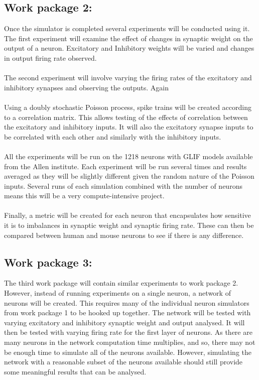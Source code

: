 \documentclass{epsrc}
\begin{document}
\subsection{Work package 2:}
\noindent
Once the simulator is completed several experiments will be conducted using it. The first experiment will examine the effect of changes in synaptic weight on the output of a neuron. Excitatory and Inhibitory weights will be varied and changes in output firing rate observed. 
\\\\
The second experiment will involve varying the firing rates of the excitatory and inhibitory synapses and observing the outputs. Again 
\\\\
Using a doubly stochastic Poisson process, spike trains will be created according to a correlation matrix. This allows testing of the effects of correlation between the excitatory and inhibitory inputs. It will also the excitatory synapse inputs to be correlated with each other and similarly with the inhibitory inputs. 
\\\\
All the experiments will be run on the 1218 neurons with GLIF models available from the Allen institute. Each experiment will be run several times and results averaged as they will be slightly different given the random nature of the Poisson inputs. Several runs of each simulation combined with the number of neurons means this will be a very compute-intensive project.
\\\\
Finally, a metric will be created for each neuron that encapsulates how sensitive it is to imbalances in synaptic weight and synaptic firing rate. These can then be compared between human and mouse neurons to see if there is any difference.
\\
\subsection{Work package 3:}
\noindent
The third work package will contain similar experiments to work package 2. However, instead of running experiments on a single neuron, a network of neurons will be created. This requires many of the individual neuron simulators from work package 1 to be hooked up together. The network will be tested with varying excitatory and inhibitory synaptic weight and output analysed. It will then be tested with varying firing rate for the first layer of neurons. As there are many neurons in the network computation time multiplies, and so, there may not be enough time to simulate all of the neurons available. However, simulating the network with a reasonable subset of the neurons available should still provide some meaningful results that can be analysed.
\\
\end{document}
